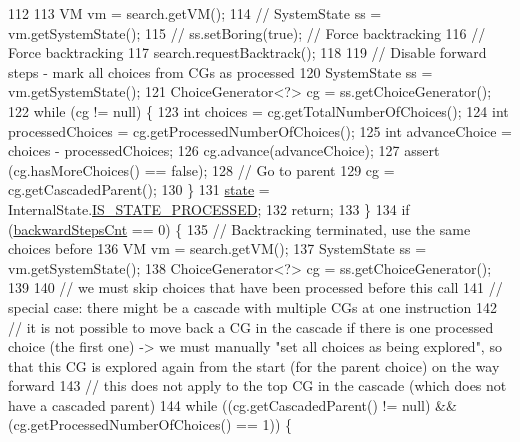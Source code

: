 \begin{DoxyCode}
112 
113       VM vm = search.getVM();
114       \textcolor{comment}{// SystemState ss = vm.getSystemState();}
115       \textcolor{comment}{// ss.setBoring(true); // Force backtracking}
116       \textcolor{comment}{// Force backtracking}
117       search.requestBacktrack();
118 
119       \textcolor{comment}{// Disable forward steps - mark all choices from CGs as processed}
120       SystemState ss = vm.getSystemState();
121       ChoiceGenerator<?> cg = ss.getChoiceGenerator();
122       \textcolor{keywordflow}{while} (cg != null) \{
123         \textcolor{keywordtype}{int} choices = cg.getTotalNumberOfChoices();
124         \textcolor{keywordtype}{int} processedChoices = cg.getProcessedNumberOfChoices();
125         \textcolor{keywordtype}{int} advanceChoice = choices - processedChoices;
126         cg.advance(advanceChoice);
127         assert (cg.hasMoreChoices() == \textcolor{keyword}{false});
128         \textcolor{comment}{// Go to parent}
129         cg = cg.getCascadedParent();
130       \}
131       \hyperlink{classgov_1_1nasa_1_1jpf_1_1inspector_1_1server_1_1jpf_1_1_inspector_listener_mode_silent_ae3c50b2d5f0793f31814abb26adbf6e4}{state} = InternalState.\hyperlink{enumgov_1_1nasa_1_1jpf_1_1inspector_1_1server_1_1jpf_1_1_inspector_listener_mode_silent_1_1_internal_state_a03d7763804ef0653ffd90b3973ffa83d}{IS\_STATE\_PROCESSED};
132       \textcolor{keywordflow}{return};
133     \}
134     \textcolor{keywordflow}{if} (\hyperlink{classgov_1_1nasa_1_1jpf_1_1inspector_1_1server_1_1jpf_1_1_inspector_listener_mode_silent_a70d97ae5dc8e288d8a07700f77a69ba8}{backwardStepsCnt} == 0) \{
135       \textcolor{comment}{// Backtracking terminated, use the same choices before}
136       VM vm = search.getVM();
137       SystemState ss = vm.getSystemState();
138       ChoiceGenerator<?> cg = ss.getChoiceGenerator();
139       
140       \textcolor{comment}{// we must skip choices that have been processed before this call}
141       \textcolor{comment}{// special case: there might be a cascade with multiple CGs at one instruction}
142         \textcolor{comment}{// it is not possible to move back a CG in the cascade if there is one processed choice (the first
       one) -> we must manually "set all choices as being explored", so that this CG is explored again from the
       start (for the parent choice) on the way forward}
143       \textcolor{comment}{// this does not apply to the top CG in the cascade (which does not have a cascaded parent)}
144       \textcolor{keywordflow}{while} ((cg.getCascadedParent() != null) && (cg.getProcessedNumberOfChoices() == 1)) \{

\end{DoxyCode}
